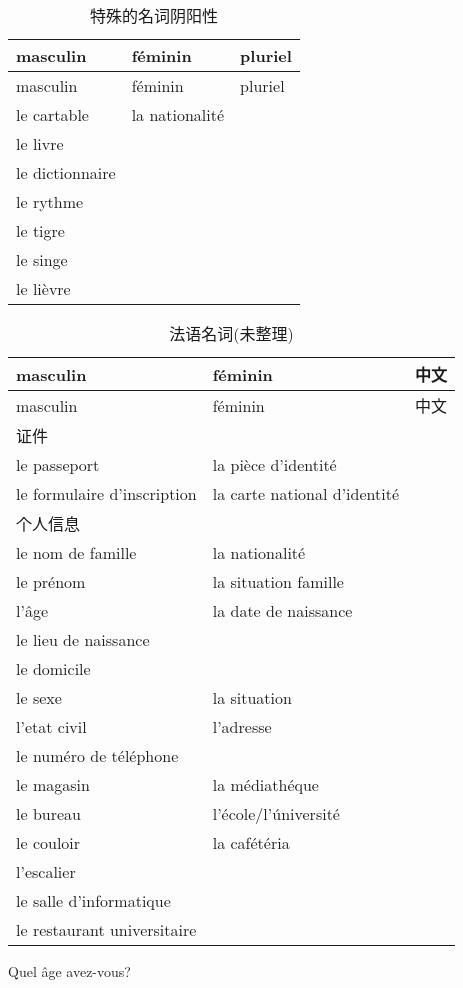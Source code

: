 \documentclass[12pt,A4paper,oneside,reqno]{amsart}
\numberwithin{equation}{section}
\theoremstyle{plain}
\theoremstyle{plain}
\theoremstyle{plain}
\numberwithin{equation}{section}
\theoremstyle{remark}
\begin{document}
	\begin{longtable}{|l|l|l|}
	\hline
	masculin	&	f\'{e}minin	& pluriel		\\
	\hline
	\endhead
	\hline
	masculin	&	f\'{e}minin	& pluriel		\\
	\hline
	\endfirsthead	
	\hline
	\endfoot
	\hline		
	\caption{特殊的名词阴阳性}
	\endlastfoot				
				
le cartable	&	la nationalit\'{e}	&		\\
le livre	&		&		\\
le dictionnaire	&		&		\\
le rythme	&		&		\\
le tigre	&		&		\\
le singe	&		&		\\
le li\`{e}vre	&		&		\\

\end{longtable}
\begin{longtable}{l|l|c}
	\hline
		masculin	&	f\'{e}minin	& 中文		\\
	\hline
	\endhead
	\hline
		masculin	&	f\'{e}minin	& 中文		\\
	\hline
	\endfirsthead	
	\hline
	\endfoot
	\hline		
	\caption{法语名词(未整理)}
	\endlastfoot				
证件	&		&		\\
le passeport	&	la pi\`{e}ce d'identit\'{e}	&		\\
le formulaire d'inscription	&	la carte national d'identit\'{e}	&		\\
\hline					
个人信息	&		&		\\
le nom de famille	&	la nationalit\'{e}	&		\\
le pr\'{e}nom	&	la situation famille	&		\\
l'\^{a}ge	&	la date de naissance	&		\\
le lieu de naissance	&		&		\\
le domicile	&		&		\\
le sexe	&	la situation	&		\\
l'etat civil	&	l'adresse	&		\\
le num\'{e}ro de t\'{e}l\'{e}phone	&		&		\\
\hline					
le magasin	&	la m\'{e}diath\'{e}que	&		\\
le bureau	&	l'\'{e}cole/l'\'{u}niversit\'{e}	&		\\
le couloir	&	la caf\'{e}t\'{e}ria	&		\\
l'escalier	&		&		\\
le salle d'informatique	&		&		\\
le restaurant universitaire	&		&		\\

\end{longtable}
Quel \^{a}ge avez-vous?
\end{document}
